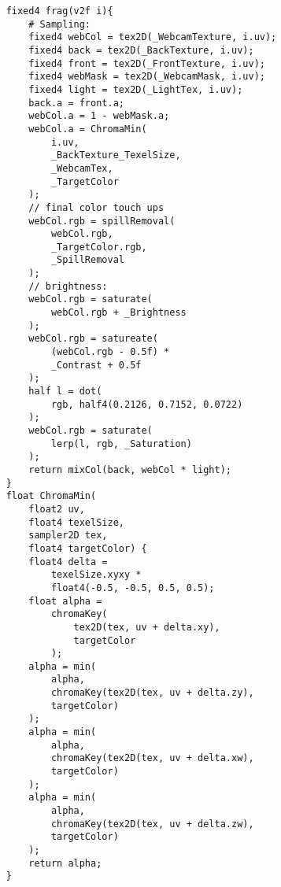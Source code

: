 \begin{lstlisting}
	fixed4 frag(v2f i){
		# Sampling:
		fixed4 webCol = tex2D(_WebcamTexture, i.uv);
		fixed4 back = tex2D(_BackTexture, i.uv);
		fixed4 front = tex2D(_FrontTexture, i.uv);
		fixed4 webMask = tex2D(_WebcamMask, i.uv);
		fixed4 light = tex2D(_LightTex, i.uv);
		back.a = front.a;
		webCol.a = 1 - webMask.a;
		webCol.a = ChromaMin(
			i.uv,
			_BackTexture_TexelSize,
			_WebcamTex,
			_TargetColor
		);
		// final color touch ups
		webCol.rgb = spillRemoval(
			webCol.rgb,
			_TargetColor.rgb,
			_SpillRemoval
		);
		// brightness:
		webCol.rgb = saturate(
			webCol.rgb + _Brightness
		);
		webCol.rgb = satureate(
			(webCol.rgb - 0.5f) *
			_Contrast + 0.5f
		);
		half l = dot(
			rgb, half4(0.2126, 0.7152, 0.0722)
		);
		webCol.rgb = saturate(
			lerp(l, rgb, _Saturation)
		);
		return mixCol(back, webCol * light);
	}
	float ChromaMin(
		float2 uv,
		float4 texelSize,
		sampler2D tex,
		float4 targetColor) {
		float4 delta =
			texelSize.xyxy *
			float4(-0.5, -0.5, 0.5, 0.5);
		float alpha = 
			chromaKey(
				tex2D(tex, uv + delta.xy),
				targetColor
			);
		alpha = min(
			alpha,
			chromaKey(tex2D(tex, uv + delta.zy),
			targetColor)
		);
		alpha = min(
			alpha,
			chromaKey(tex2D(tex, uv + delta.xw),
			targetColor)
		);
		alpha = min(
			alpha,
			chromaKey(tex2D(tex, uv + delta.zw),
			targetColor)
		);
		return alpha;
	}
	

\end{lstlisting}
